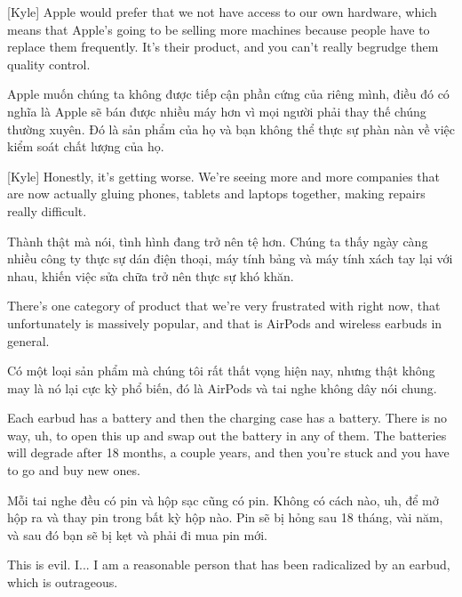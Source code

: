 \documentclass[a4paper]{article}
\begin{document}
	[Kyle] Apple would prefer that we not have access to our own hardware, which means that Apple's going to be selling more machines because people have to replace them frequently. It's their product, and you can't really begrudge them quality control.
	
	\begin{vietnamese-v2}
		[Kyle] Apple muốn chúng ta không được tiếp cận phần cứng của riêng mình, điều đó có nghĩa là Apple sẽ bán được nhiều máy hơn vì mọi người phải thay thế chúng thường xuyên. Đó là sản phẩm của họ và bạn không thể thực sự phàn nàn về việc kiểm soát chất lượng của họ.
	\end{vietnamese-v2}
	
	[Kyle] Honestly, it's getting worse. We're seeing more and more companies that are now actually gluing phones, tablets and laptops together, making repairs really difficult.
	
	\begin{vietnamese-v2}
		[Kyle] Thành thật mà nói, tình hình đang trở nên tệ hơn. Chúng ta thấy ngày càng nhiều công ty thực sự dán điện thoại, máy tính bảng và máy tính xách tay lại với nhau, khiến việc sửa chữa trở nên thực sự khó khăn.
	\end{vietnamese-v2}
	
	There's one category of product that we're very frustrated with right now, that unfortunately is massively popular, and that is AirPods and wireless earbuds in general.
	
	\begin{vietnamese-v2}
		Có một loại sản phẩm mà chúng tôi rất thất vọng hiện nay, nhưng thật không may là nó lại cực kỳ phổ biến, đó là AirPods và tai nghe không dây nói chung.
	\end{vietnamese-v2}
	
	Each earbud has a battery and then the charging case has a battery.
	There is no way, uh, to open this up and swap out the battery in any of them.
	The batteries will degrade after 18 months, a couple years, and then you're stuck and you have to go and buy new ones.
	
	\begin{vietnamese-v2}
		Mỗi tai nghe đều có pin và hộp sạc cũng có pin.
		Không có cách nào, uh, để mở hộp ra và thay pin trong bất kỳ hộp nào.
		Pin sẽ bị hỏng sau 18 tháng, vài năm, và sau đó bạn sẽ bị kẹt và phải đi mua pin mới.
	\end{vietnamese-v2}
	
	
	This is evil.
	I... I am a reasonable person that has been radicalized by an earbud, which is outrageous.
	
\end{document}
